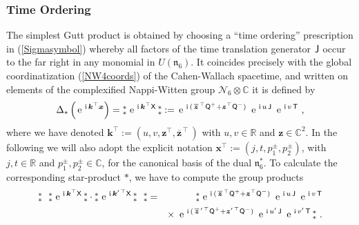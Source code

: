 \documentclass[11pt,a4paper]{article}
\newcommand{\NOa}{\mbox{$\substack{\ast\\\ast}$}}       %
\newcommand{\ii}{{\rm i}}
\newcommand{\mbf}[1]{{\boldsymbol {#1} }}
\def\ii{{\,{\rm i}\,}}
\def\T{{\sf T}}
\def\X{{\sf X}}
\def\Q{{\sf Q}}
\def\J{{\sf J}}
\def\mz{{\mbf z}}
\def\mx{{\mbf x}}
\def\mk{{\mbf k}}
\def\mfn{{\mathfrak n}}
\newcommand{\complex}{{\mathbb C}} %
\newcommand{\real}{{\mathbb R}} %
\def\e{{\,\rm e}\,}
\def\bea{\begin{eqnarray}}
\def\eea{\end{eqnarray}}
\begin{document}
\subsubsection{Time Ordering\label{TOP}}

The simplest Gutt product is obtained by choosing a ``time ordering''
prescription in (\ref{Sigmasymbol}) whereby all factors of the time
translation generator $\J$ occur to the far right in any monomial in
$U(\mfn_6)$. It coincides precisely with the global coordinatization
(\ref{NW4coords}) of the Cahen-Wallach spacetime, and written on
elements of the complexified Nappi-Witten group
$\mathcal{N}_6\otimes\complex$ it is defined by
\begin{equation}
  \label{eq:time:defn}
\Delta_*\left(\e^{\ii\mk^\top\mx}\right)=
\NOa\,\e^{\ii\mk^\top\X}\,\NOa:=\e^{\ii(\,\overline{\mz}^{\,\top}\Q^+
+\mz^\top\Q^-)}~\e^{\ii u\,\J}~\e^{\ii v\,\T} \ ,
\end{equation}
where we have denoted
$\mk^\top:=(u,v,\mz^\top,\overline{\mz}^{\,\top}\,)$ with
$u,v\in\real$ and $\mz\in\complex^2$. In the following we will also
adopt the explicit notation $\mx^\top:=(j,t,p_1^\pm,p_2^\pm)$, with
$j,t\in\real$ and $p_1^\pm,p_2^{\pm}\in\complex$, for the
canonical basis of the dual $\mfn_6^*$. To calculate the corresponding
star-product $*$, we have to compute the group products
\bea
\NOa~~\NOa\,\e^{\ii\mk^\top\X}\,\NOa\cdot\NOa\,\e^{\ii\mk^{\prime\,\top}\X}
\,\NOa~~\NOa&=&\NOa\,\e^{\ii(\,\overline{\mz}^{\,\top}\Q^+
+\mz^\top\Q^-)}~\e^{\ii u\,\J}~\e^{\ii v\,\T}\nonumber\\&&\times~
\e^{\ii(\,\overline{\mz}^{\,\prime\,\top}\Q^+
+\mz^{\prime\,\top}\Q^-)}~\e^{\ii u'\,\J}~\e^{\ii v'\,\T}\,\NOa \ .
\label{TOgpprods}\eea
\end{document}
